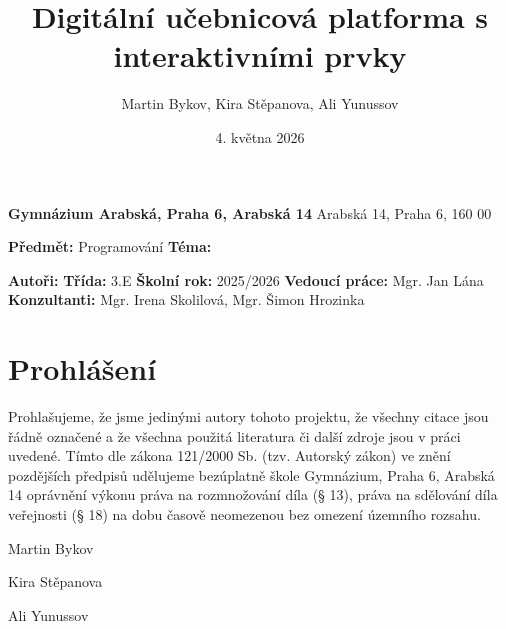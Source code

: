\documentclass[12pt]{article}
\title{
	Digitální učebnicová platforma s interaktivními prvky
}
\author{
	Martin Bykov, Kira Stěpanova, Ali Yunussov
}
\date{4. května 2026}
\begin{document}
	\maketitle
	\thispagestyle{empty}
	\newpage

	\noindent
	\textbf{\Large Gymnázium Arabská, Praha 6, Arabská 14} 	\newline
	Arabská 14, Praha 6, 160 00

	\vspace*{\fill}

	\noindent
	\textbf{Předmět:} Programování 	\newline
	\textbf{Téma:} \thetitle

	\vspace*{\fill}

	\noindent
	\textbf{Autoři:} {\theauthor} \newline
	\textbf{Třída:} {3.E} \newline
	\textbf{Školní rok:} {2025/2026} \newline
	\textbf{Vedoucí práce:} {Mgr. Jan Lána} \newline
	\textbf{Konzultanti:} {Mgr. Irena Skolilová, Mgr. Šimon Hrozinka} \newline

 	 \newpage
 	\section*{Prohlášení}
 	Prohlašujeme, že jsme jedinými autory tohoto projektu, že všechny citace jsou řádně označené a že všechna použitá literatura či další zdroje jsou v práci uvedené.
 	Tímto dle zákona 121/2000 Sb. (tzv. Autorský zákon) ve znění pozdějších předpisů udělujeme bezúplatně škole Gymnázium, Praha 6, Arabská 14 oprávnění výkonu práva na rozmnožování díla (§ 13), práva na sdělování díla veřejnosti (§ 18) na dobu časově neomezenou bez omezení územního rozsahu.

 	\vspace*{2cm}

 	\noindent
 	Martin Bykov
 	\hspace{1.2cm}
 	\hrulefill

 	\vspace*{2cm}

	\noindent
 	Kira Stěpanova
 	\hspace{1cm}
 	\hrulefill
 	
 	\vspace*{2cm}

 	\noindent
 	Ali Yunussov
 	\hspace{1.4cm}
 	\hrulefill
\end{document}
